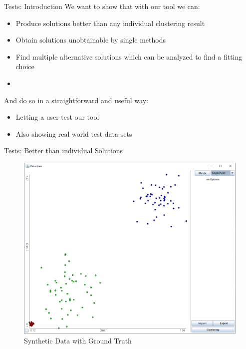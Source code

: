 \documentclass[aspectratio=169]{beamer}
\begin{document}
\begin{frame}{Tests: Introduction}
We want to show that with our tool we can:

	\begin{itemize}
		\item Produce solutions better than any individual clustering result
		\item Obtain solutions unobtainable by single methods
		\item Find multiple alternative solutions which can be analyzed to find a fitting choice
		\item[]
	\end{itemize}

And do so in a straightforward and useful way:
	\begin{itemize}
		\item Letting a user test our tool
		\item Also showing real world test data-sets
	\end{itemize}
\end{frame}

\begin{frame}{Tests: Better than individual Solutions}
	\begin{figure}[h]
		\centering
		\includegraphics[width=.64\textwidth]{better_base}
		\caption{Synthetic Data with Ground Truth}
		\label{fig:better_base}
	\end{figure}
\end{frame}
\end{document}
